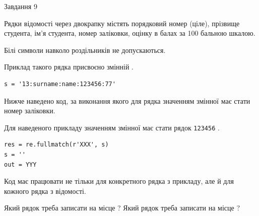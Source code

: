 \documentclass[12pt, ukrainian]{article}
\def\code#1{\Verb!#1!}
\begin{document}
{\begin{minipage}[t]{8.0cm}
\end{minipage}

               
{\begin{center}Завдання {9}\end{center}}
\vspace{-4mm}
Рядки відомості через двокрапку містять порядковий номер (ціле), пріз\-ви\-ще студен\-та, ім'я студента, номер заліковки, оцінку в балах за 100 бальною шкалою.

Білі символи навколо роздільників не допускаються.

Приклад такого рядка присвоєно змінній .



\begin{verbatim}
s = '13:surname:name:123456:77'
\end{verbatim}


Нижче наведено код, за виконання якого для рядка  значенням змінної  має стати номер заліковки.

Для наведеного прикладу значенням змінної  має стати рядок \code{123456} .



\begin{verbatim}
res = re.fullmatch(r'XXX', s)
s = ''
out = YYY
\end{verbatim}


Код має працювати не тільки для конкретного рядка з прикладу, але й для кожного рядка з відомості.


Який рядок треба записати на місце  ?
Який рядок треба записати на місце  ?\par

}
\end{document}

